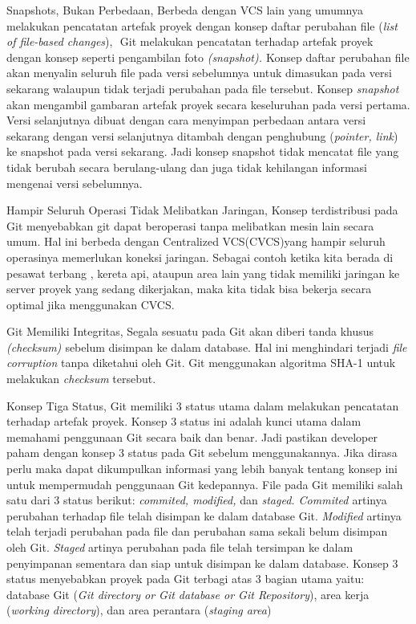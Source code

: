 Snapshots, Bukan Perbedaan, Berbeda $  $dengan VCS lain yang umumnya melakukan pencatatan artefak proyek dengan konsep daftar perubahan file (\textit{list of file-based changes}), $  $ $  $Git melakukan pencatatan terhadap artefak proyek dengan konsep seperti pengambilan foto \textit{(snapshot). $  $}Konsep daftar perubahan file akan menyalin seluruh file pada versi sebelumnya untuk dimasukan pada versi sekarang walaupun tidak terjadi perubahan pada file tersebut. Konsep \textit{snapshot $  $}akan mengambil gambaran artefak proyek secara keseluruhan pada versi pertama. Versi selanjutnya dibuat dengan cara menyimpan perbedaan antara versi sekarang dengan versi selanjutnya ditambah dengan penghubung (\textit{pointer, link}) ke snapshot pada versi sekarang. Jadi konsep snapshot tidak mencatat file yang tidak berubah secara berulang-ulang dan juga tidak kehilangan informasi mengenai versi sebelumnya. \par
\noindent 
Hampir Seluruh Operasi Tidak Melibatkan Jaringan, Konsep terdistribusi pada Git menyebabkan git dapat beroperasi tanpa melibatkan mesin lain secara umum. Hal ini berbeda dengan Centralized VCS(CVCS)yang hampir seluruh operasinya memerlukan koneksi jaringan. Sebagai contoh ketika kita berada di pesawat terbang , kereta api, ataupun area lain yang tidak memiliki jaringan ke server proyek yang sedang dikerjakan, maka kita tidak bisa bekerja secara optimal jika menggunakan CVCS. \par
\noindent 
Git Memiliki Integritas, Segala sesuatu pada Git akan diberi tanda khusus \textit{(checksum) $  $}sebelum disimpan ke dalam database. Hal ini menghindari terjadi\textit{ file corruption} tanpa diketahui oleh Git. Git menggunakan algoritma SHA-1 untuk melakukan \textit{checksum} tersebut. \par
\noindent 
Konsep Tiga Status, $  $Git memiliki 3 status utama dalam melakukan pencatatan terhadap artefak proyek. Konsep 3 status ini adalah kunci utama dalam memahami penggunaan Git secara baik dan benar. Jadi pastikan developer paham dengan konsep 3 status pada Git sebelum menggunakannya. Jika dirasa perlu maka dapat dikumpulkan informasi yang lebih banyak tentang konsep ini untuk mempermudah penggunaan Git kedepannya. File pada Git memiliki salah satu dari 3 status berikut: \textit{commited, modified,} dan \textit{staged. Commited $  $}artinya perubahan terhadap file telah disimpan ke dalam database Git. \textit{Modified} artinya telah terjadi perubahan pada file dan perubahan sama sekali belum disimpan oleh Git. \textit{Staged} artinya perubahan pada file telah tersimpan ke dalam penyimpanan sementara dan siap untuk disimpan ke dalam database. Konsep 3 status menyebabkan proyek pada Git terbagi atas 3 bagian utama yaitu: database Git (\textit{Git directory or Git database or Git Repository}), area kerja (\textit{working directory}), dan area perantara (\textit{staging area})  \par
